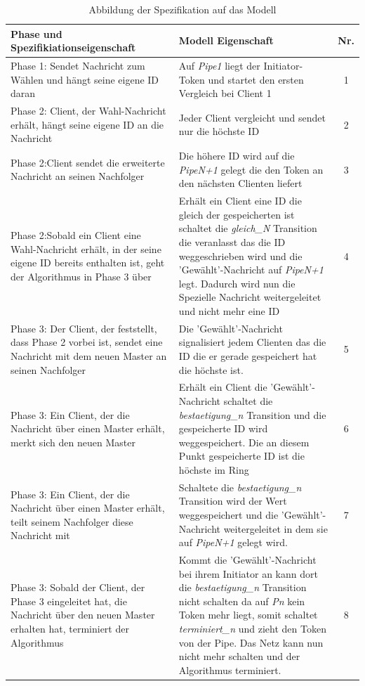 \begin{table}[H]
\centering
\begin{tabular}{|p{}|p{}|c|}
\hline Phase und Spezifikiationseigenschaft & Modell Eigenschaft & Nr.\\ 
\hline Phase 1: Sendet Nachricht zum Wählen und hängt seine eigene ID daran & Auf \textit{Pipe1} liegt der Initiator-Token und startet den ersten Vergleich bei Client 1   & 1\\ 
\hline Phase 2: Client, der Wahl-Nachricht erhält, hängt seine eigene ID an die Nachricht & Jeder Client vergleicht und sendet nur die höchste ID & 2\\
\hline Phase 2:Client sendet die erweiterte Nachricht an seinen Nachfolger & Die höhere ID wird auf die \textit{PipeN+1} gelegt die den Token an den nächsten Clienten liefert & 3\\
\hline Phase 2:Sobald ein Client eine Wahl-Nachricht erhält, in der seine eigene ID bereits enthalten ist, geht der Algorithmus in Phase 3 über & Erhält ein Client eine ID die gleich der gespeicherten ist schaltet die \textit{gleich\_N} Transition die veranlasst das die ID weggeschrieben wird und die 'Gewählt'-Nachricht auf \textit{PipeN+1} legt. Dadurch wird nun die Spezielle Nachricht weitergeleitet und nicht mehr eine ID & 4\\
\hline Phase 3: Der Client, der feststellt, dass Phase 2 vorbei ist, sendet eine Nachricht mit dem neuen Master an seinen Nachfolger &  Die 'Gewählt'-Nachricht signalisiert jedem Clienten das die ID die er gerade gespeichert hat die höchste ist.  &5\\
\hline Phase 3: Ein Client, der die Nachricht über einen Master erhält, merkt sich den neuen Master & Erhält ein Client die 'Gewählt'-Nachricht schaltet die \textit{bestaetigung\_n} Transition und die gespeicherte ID wird weggespeichert. Die an diesem Punkt gespeicherte ID ist die höchste im Ring &6\\ 
\hline Phase 3: Ein Client, der die Nachricht über einen Master erhält, teilt seinem Nachfolger diese Nachricht mit & Schaltete die \textit{bestaetigung\_n} Transition wird der Wert weggespeichert und die 'Gewählt'-Nachricht weitergeleitet in dem sie auf \textit{PipeN+1} gelegt wird. & 7\\
\hline Phase 3: Sobald der Client, der Phase 3 eingeleitet hat, die Nachricht über den neuen Master erhalten hat, terminiert der Algorithmus & Kommt die 'Gewählt'-Nachricht bei ihrem Initiator an kann dort die \textit{bestaetigung\_n} Transition nicht schalten da auf \textit{Pn} kein Token mehr liegt, somit schaltet \textit{terminiert\_n} und zieht den Token von der Pipe. Das Netz kann nun nicht mehr schalten und der Algorithmus terminiert. &8\\
\hline 
\end{tabular}
\caption{Abbildung der Spezifikation auf das Modell}
\label{table: speci_modell} 
\end{table}

